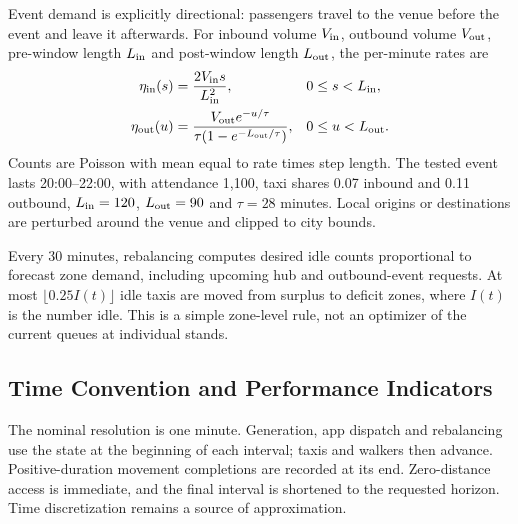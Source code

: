 \documentclass[10pt,twocolumn,letterpaper]{article}
\begin{document}
Event demand is explicitly directional: passengers travel to the venue before
the event and leave it afterwards. For inbound volume $V_{\rm in}$, outbound
volume $V_{\rm out}$, pre-window length $L_{\rm in}$ and post-window length
$L_{\rm out}$, the per-minute rates are
\begin{align}
 \eta_{\rm in}(s)&=\frac{2V_{\rm in}s}{L_{\rm in}^2},
       &&0\leq s<L_{\rm in},\label{eq:eventin}\\
 \eta_{\rm out}(u)&=\frac{V_{\rm out}e^{-u/\tau}}
 {\tau(1-e^{-L_{\rm out}/\tau})},
       &&0\leq u<L_{\rm out}.\label{eq:eventout}
\end{align}
Counts are Poisson with mean equal to rate times step length. The tested event
lasts 20:00--22:00, with attendance 1,100, taxi shares 0.07 inbound and 0.11
outbound, $L_{\rm in}=120$, $L_{\rm out}=90$ and $\tau=28$ minutes. Local origins
or destinations are perturbed around the venue and clipped to city bounds.

Every 30 minutes, rebalancing computes desired idle counts proportional to
forecast zone demand, including upcoming hub and outbound-event requests.
At most $\lfloor0.25I(t)\rfloor$ idle taxis are moved from surplus to deficit
zones, where $I(t)$ is the number idle. This is a simple zone-level rule, not
an optimizer of the current queues at individual stands.

\subsection{Time Convention and Performance Indicators}
The nominal resolution is one minute. Generation, app dispatch and rebalancing
use the state at the beginning of each interval; taxis and walkers then advance.
Positive-duration movement completions are recorded at its end. Zero-distance
access is immediate, and the final interval is shortened to the requested
horizon. Time discretization remains a source of approximation.
\end{document}
